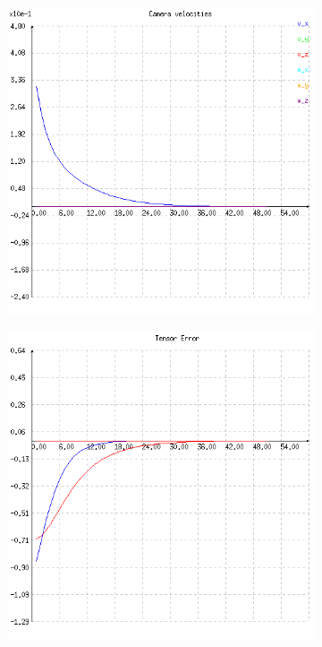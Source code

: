 \begin{figure}[ht!]
\begin{subfigure}{.48\linewidth}
    \caption{}
    \label{fig:ex1cscene}
  \end{subfigure}
  \\
  \begin{subfigure}{.48\linewidth}
    \centering
    \includegraphics[width=\linewidth]{figures/plots/ex1cvelocity.png}
    \caption{}
    \label{fig:ex1cvelocity}
  \end{subfigure}
  \begin{subfigure}{.48\linewidth}
    \centering
    \includegraphics[width=\linewidth]{figures/plots/ex1cerror.png}

\end{subfigure}
\end{figure}
